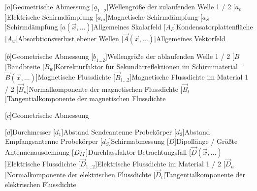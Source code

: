 \begin{acronym}[Platzhalterwort]

[$a$]{\acrounit{\meter}Geometrische Abmessung}
[$\underline{a}_{1\ldots2}$]{\acrounit{-}Wellengröße der zulaufenden Welle 1 / 2}
[$a_e$]{\acrounit{\Dezibel}Elektrische Schirmdämpfung}
[$a_m$]{\acrounit{\Dezibel}Magnetische Schirmdämpfung}
[$a_S$]{\acrounit{\Dezibel}Schirmdämpfung}
[$a(\vec x,\ldots)$]{\acrounit{-}Allgemeines Skalarfeld}
[$A_P$]{\acrounit{\square\meter}Kondensatorplattenfläche}
[$A_w$]{\acrounit{\Dezibel}Absorbtionsverlust ebener Wellen}
[$\vec A(\vec x,\ldots)$]{\acrounit{-}Allgemeines Vektorfeld}

[$b$]{\acrounit{\meter}Geometrische Abmessung}
[$\underline{b}_{1\ldots2}$]{\acrounit{-}Wellengröße der ablaufenden Welle 1 / 2}
[$B$]{\acrounit{\hertz}Bandbreite}
[$B_w$]{\acrounit{\Dezibel}Korrekturfaktor für Sekundärreflektionen im Schirmmaterial}
[$\vec B(\vec x, \ldots)$]{\acrounit{\tesla}Magnetische Flussdichte}
[$\vec B_{1\ldots2}$]{\acrounit{\tesla}Magnetische Flussdichte im Material 1 / 2}
[$\vec B_n$]{\acrounit{\tesla}Normalkomponente der magnetischen Flussdichte}
[$\vec B_t$]{\acrounit{\tesla}Tangentialkomponente der magnetischen Flussdichte}

[$c$]{\acrounit{\meter}Geometrische Abmessung}

[$d$]{\acrounit{\meter}Durchmesser}
[$d_1$]{\acrounit{\meter}Abstand Sendeantenne Probekörper}
[$d_2$]{\acrounit{\meter}Abstand Empfangsantenne Probekörper}
[$d_S$]{\acrounit{\meter}Schirmabmessung}
[$D$]{\acrounit{\meter}Dipollänge / Größte Antennenausdehnung}
[$D_{\uproman{2}}$]{Durchlassfaktor Betrachtungsfall }
[$\vec D(\vec x, \ldots)$]{\acrounit{\ampere\second\per\square\meter}Elektrische Flussdichte}
[$\vec D_{1\ldots2}$]{\acrounit{\ampere\second\per\square\meter}Elektrische Flussdichte im Material 1 / 2}
[$\vec D_n$]{\acrounit{\ampere\second\per\square\meter}Normalkomponente der elektrischen Flussdichte}
[$\vec D_t$]{\acrounit{\ampere\second\per\square\meter}Tangentialkomponente der elektrischen Flussdichte}



\end{acronym}
